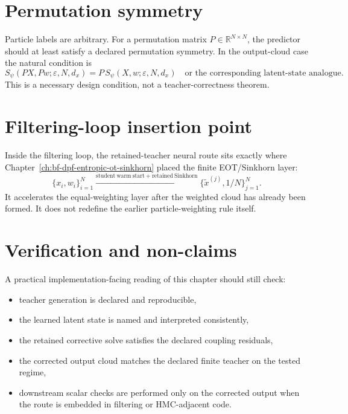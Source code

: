 \section{Permutation symmetry}
\label{sec:bf-learned-ot-symmetry}

Particle labels are arbitrary.  For a permutation matrix
\(P\in\mathbb R^{N\times N}\), the predictor should at least satisfy a declared
permutation symmetry.  In the output-cloud case the natural condition is
\begin{equation}
\label{eq:bf-learned-ot-equivariance}
  S_\psi(PX,Pw;\varepsilon,N,d_x)
  =
  P\,S_\psi(X,w;\varepsilon,N,d_x)
  \quad
  \text{or the corresponding latent-state analogue.}
\end{equation}
This is a necessary design condition, not a teacher-correctness theorem.

\section{Filtering-loop insertion point}
\label{sec:bf-learned-ot-loop}

Inside the filtering loop, the retained-teacher neural route sits exactly where
Chapter~\ref{ch:bf-dpf-entropic-ot-sinkhorn} placed the finite EOT/Sinkhorn
layer:
\begin{equation}
\label{eq:bf-learned-ot-loop}
  \{x_i,w_i\}_{i=1}^N
  \xrightarrow{\mathrm{student\ warm\ start + retained\ Sinkhorn}}
  \{\tilde x^{(j)},1/N\}_{j=1}^N.
\end{equation}
It accelerates the equal-weighting layer after the weighted cloud has already
been formed.  It does not redefine the earlier particle-weighting rule itself.

\section{Verification and non-claims}
\label{sec:bf-learned-ot-verification}
\label{sec:bf-learned-ot-boundary}

A practical implementation-facing reading of this chapter should still check:
\begin{itemize}
  \item teacher generation is declared and reproducible,
  \item the learned latent state is named and interpreted consistently,
  \item the retained corrective solve satisfies the declared coupling residuals,
  \item the corrected output cloud matches the declared finite teacher on the
  tested regime,
  \item downstream scalar checks are performed only on the corrected output when
  the route is embedded in filtering or HMC-adjacent code.
\end{itemize}

